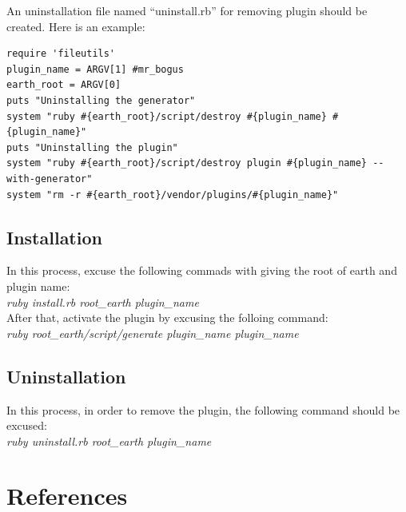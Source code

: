 \documentclass[10pt,oneside]{article}
\begin{document}
An uninstallation file named “uninstall.rb” for removing plugin should be created. Here is an example:\\

\begin{verbatim}
require 'fileutils' 
plugin_name = ARGV[1] #mr_bogus 
earth_root = ARGV[0]  
puts "Uninstalling the generator" 
system "ruby #{earth_root}/script/destroy #{plugin_name} #{plugin_name}" 
puts "Uninstalling the plugin" 
system "ruby #{earth_root}/script/destroy plugin #{plugin_name} --with-generator" 
system "rm -r #{earth_root}/vendor/plugins/#{plugin_name}"
\end{verbatim}
\subsection{Installation}
In this process, excuse the following commads with giving the root of earth and plugin name:\\
\textit{ruby install.rb root\_earth plugin\_name}\\
After that, activate the plugin by excusing the folloing command:\\
\textit{ruby root\_earth/script/generate plugin\_name plugin\_name}\\

\subsection{Uninstallation}

In this process, in order to remove the plugin, the following command should be excused:\\
\textit{ruby uninstall.rb root\_earth plugin\_name}\\


\section{References}
 
\end{document}
